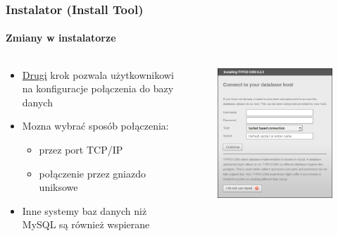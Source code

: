 
\begin{frame}[fragile]
	\frametitle{Instalator (Install Tool)}
	\framesubtitle{Zmiany w instalatorze}

	\begin{columns}[T]

		\begin{column}{.5\textwidth}
			\begin{itemize}
				\item \underline{Drugi} krok pozwala użytkownikowi na konfiguracje połączenia do bazy danych
				\item Mozna wybrać sposób połączenia:
					\begin{itemize}
						\item przez port TCP/IP 
						\item połączenie przez gniazdo uniksowe
					\end{itemize}
				\item Inne systemy baz danych niż MySQL są również wspierane
			\end{itemize}
		\end{column}

		\begin{column}{.5\textwidth}
			\begin{figure}\vspace*{-0.4cm}
				\includegraphics[width=0.8\linewidth]{Images/InstallTool/DatabaseConnectionDetails.png}
			\end{figure}
		\end{column}

	\end{columns}

\end{frame}

